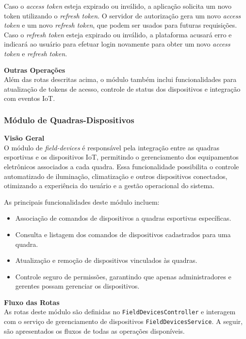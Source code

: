 Caso o \textit{access token} esteja expirado ou inválido, a aplicação solicita um novo token utilizando o \textit{refresh token}. O servidor de autorização gera um novo \textit{access token} e um novo \textit{refresh token}, que podem ser usados para futuras requisições. Caso o \textit{refresh token} esteja expirado ou inválido, a plataforma acusará erro e indicará ao usuário para efetuar login novamente para obter um novo \textit{access token} e \textit{refresh token}.
 
\textbf{Outras Operações}\\
Além das rotas descritas acima, o módulo também inclui funcionalidades para atualização de tokens de acesso, controle de status dos dispositivos e integração com eventos IoT.

\subsubsection{Módulo de Quadras-Dispositivos}\label{subsubsec:modulo_quadras_dispositivos}

\textbf{Visão Geral}\\
O módulo de \textit{field-devices} é responsável pela integração entre as quadras esportivas e os dispositivos IoT, permitindo o gerenciamento dos equipamentos eletrônicos associados a cada quadra. Essa funcionalidade possibilita o controle automatizado de iluminação, climatização e outros dispositivos conectados, otimizando a experiência do usuário e a gestão operacional do sistema.

As principais funcionalidades deste módulo incluem:

\begin{itemize}
\item Associação de comandos de dispositivos a quadras esportivas específicas.
\item Consulta e listagem dos comandos de dispositivos cadastrados para uma quadra.
\item Atualização e remoção de dispositivos vinculados às quadras.
\item Controle seguro de permissões, garantindo que apenas administradores e gerentes possam gerenciar os dispositivos.
\end{itemize}

\textbf{Fluxo das Rotas}\\
As rotas deste módulo são definidas no \texttt{FieldDevicesController} e interagem com o serviço de gerenciamento de dispositivos \texttt{FieldDevicesService}. A seguir, são apresentados os fluxos de todas as operações disponíveis.

